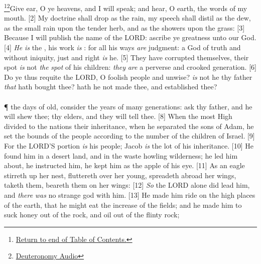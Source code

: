 \footnote{\textcolor[cmyk]{0.99998,1,0,0}{\hyperlink{TOC}{Return to end of Table of Contents.}}}\footnote{\href{https://www.audioverse.org/english/audiobibles/books/ENGKJV/O/Deut/1}{\textcolor[cmyk]{0.99998,1,0,0}{Deuteronomy Audio}}}\textcolor[cmyk]{0.99998,1,0,0}{Give ear, O ye heavens, and I will speak; and hear, O earth, the words of my mouth.}
[2] \textcolor[cmyk]{0.99998,1,0,0}{My doctrine shall drop as the rain, my speech shall distil as the dew, as the small rain upon the tender herb, and as the showers upon the grass:}
[3] \textcolor[cmyk]{0.99998,1,0,0}{Because I will publish the name of the LORD: ascribe ye greatness unto our God.}
[4] \textcolor[cmyk]{0.99998,1,0,0}{\emph{He} \emph{is} the , his work \emph{is} : for all his ways \emph{are} judgment: a God of truth and without iniquity, just and right \emph{is} he.}
[5] \textcolor[cmyk]{0.99998,1,0,0}{They have corrupted themselves, their spot \emph{is} not \emph{the} \emph{spot} of his children: \emph{they} \emph{are} a perverse and crooked generation.}
[6] \textcolor[cmyk]{0.99998,1,0,0}{Do ye thus requite the LORD, O foolish people and unwise? \emph{is} not he thy father \emph{that} hath bought thee? hath he not made thee, and established thee?}\\
\\
\P \textcolor[cmyk]{0.99998,1,0,0}{ the days of old, consider the years of many generations: ask thy father, and he will shew thee; thy elders, and they will tell thee.}
[8] \textcolor[cmyk]{0.99998,1,0,0}{When the most High divided to the nations their inheritance, when he separated the sons of Adam, he set the bounds of the people according to the number of the children of Israel.}
[9] \textcolor[cmyk]{0.99998,1,0,0}{For the LORD'S portion \emph{is} his people; Jacob \emph{is} the lot of his inheritance.}
[10] \textcolor[cmyk]{0.99998,1,0,0}{He found him in a desert land, and in the waste howling wilderness; he led him about, he instructed him, he kept him as the apple of his eye.}
[11] \textcolor[cmyk]{0.99998,1,0,0}{As an eagle stirreth up her nest, fluttereth over her young, spreadeth abroad her wings, taketh them, beareth them on her wings:}
[12] \textcolor[cmyk]{0.99998,1,0,0}{\emph{So} the LORD alone did lead him, and \emph{there} \emph{was} no strange god with him.}
[13] \textcolor[cmyk]{0.99998,1,0,0}{He made him ride on the high places of the earth, that he might eat the increase of the fields; and he made him to suck honey out of the rock, and oil out of the flinty rock;}
